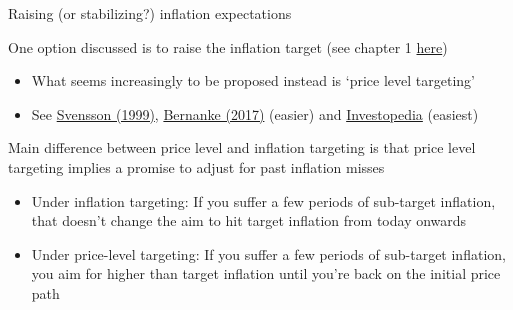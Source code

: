 \begin{frame}{Raising (or stabilizing?) inflation expectations}

One option discussed is to raise the inflation target (see chapter 1 \href{https://www.niesr.ac.uk/sites/default/files/publications/Renewing\%20our\%20Monetary\%20Vows\%20text.pdf}{here})
\begin{itemize}
\item	What seems increasingly to be proposed instead is `price level targeting'
\item	See \href{https://www.jstor.org/stable/2601112}{Svensson (1999)}, \href{https://www.brookings.edu/research/monetary-policy-in-a-new-era/}{Bernanke (2017)} (easier) and \href{https://www.investopedia.com/terms/p/price_level_targeting.asp}{Investopedia} (easiest)
\end{itemize}

\vspace{2mm}
Main difference between price level and inflation targeting is that price level targeting implies a promise to adjust for past inflation misses
\begin{itemize}
\item	Under inflation targeting: If you suffer a few periods of sub-target inflation, that doesn't change the aim to hit target inflation from today onwards
\item	Under price-level targeting: If you suffer a few periods of sub-target inflation, you aim for higher than target inflation until you're back on the initial price path
\end{itemize}

\end{frame}


	
